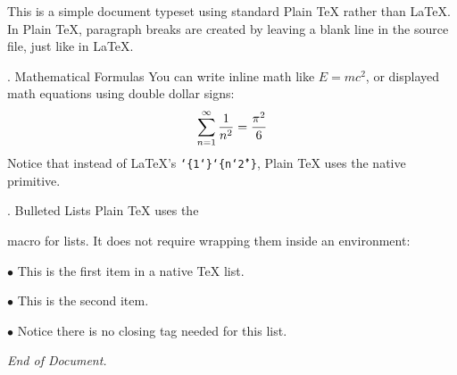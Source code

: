 This is a simple document typeset using standard {\boldfont Plain TeX} rather
than LaTeX. In Plain TeX, paragraph breaks are created by leaving a blank line
in the source file, just like in LaTeX.

\vskip 0.25in

{. Mathematical Formulas}
\medskip
You can write inline math like $E = mc^2$, or displayed math equations using
double dollar signs:
$$ \sum_{n=1}^{\infty} {1 \over n^2} = {\pi^2 \over 6} $$
Notice that instead of \LaTeX's {\tt\string\frac\char`\{1\char`\}\char`\{n\char`\^2\char`\}}, Plain TeX uses the
native {\tt\string\over} primitive.

\vskip 0.25in

{. Bulleted Lists}
\medskip
Plain TeX uses the {\tt\string\item} macro for lists. It does not require wrapping
them inside an environment:

\item{$\bullet$} This is the first item in a native TeX list.
\item{$\bullet$} This is the second item.
\item{$\bullet$} Notice there is no closing tag needed for this list.

\vskip 0.5in
\centerline{\it End of Document.}

\bye
